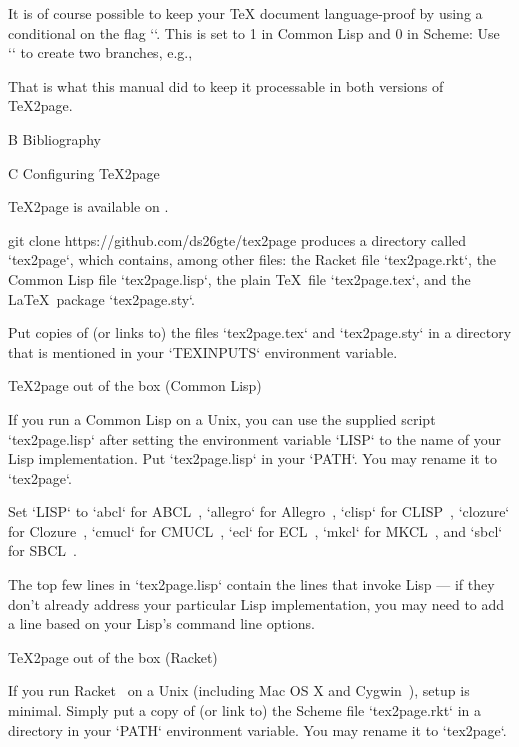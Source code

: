 It is of course possible to keep your TeX document
language-proof by using a conditional on the flag
`\TZPcommonlisp`. This is set to 1 in Common Lisp and 0 in Scheme:
Use `\ifx` to create two branches, e.g., 

\begintt
\ifx{}
\else
{}\fi
\endtt
That is what this manual did to keep it processable in both versions
of \TeX2page.

\beginchapter  B Bibliography





\beginchapter  C Configuring \TeX2page

%
\TeX2page is available on
.

\begintt
git clone https://github.com/ds26gte/tex2page
\endtt
%
produces a directory
called `tex2page`, which contains, among other files:
the Racket file `tex2page.rkt`, the Common Lisp file `tex2page.lisp`, the plain \TeX\ file
`tex2page.tex`, and the \LaTeX\ package
`tex2page.sty`.

Put copies of (or links to) the files
`tex2page.tex` and `tex2page.sty`  in a directory
that is mentioned in your `TEXINPUTS` environment
variable.

\beginsection \TeX2page out of the box (Common Lisp)

If you run a Common Lisp on a Unix, you can use the supplied script
`tex2page.lisp` after setting the environment variable `LISP` to the
name of your Lisp implementation.  Put `tex2page.lisp` in your
`PATH`. You may rename it to
`tex2page`.

Set `LISP` to
`abcl` for ABCL~\cite{abcl},
`allegro` for Allegro~\cite{allegro},
`clisp` for CLISP~\cite{clisp},
`clozure` for Clozure~\cite{clozure},
`cmucl` for CMUCL~\cite{cmucl},
`ecl` for ECL~\cite{ecl},
`mkcl` for MKCL~\cite{mkcl},
and `sbcl` for SBCL~\cite{sbcl}.

The top few lines in `tex2page.lisp` contain the lines
that invoke Lisp —  if they don’t already address your
particular Lisp
implementation, you may need to add a line based on your
Lisp’s command line options.

\beginsection \TeX2page out of the box (Racket)

%
If you run Racket~\cite{racket} on a Unix (including Mac OS X and
Cygwin~\cite{cygwin}), setup is minimal.  Simply put a copy of (or link to) the Scheme
file `tex2page.rkt` in a directory in your `PATH` environment
variable. You may rename it to `tex2page`.

